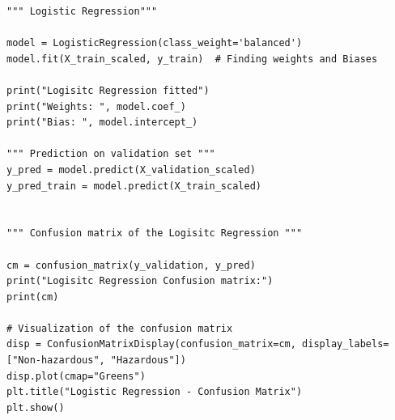 \documentclass{article}
\begin{document}
\begin{lstlisting}
""" Logistic Regression"""

model = LogisticRegression(class_weight='balanced')
model.fit(X_train_scaled, y_train)  # Finding weights and Biases

print("Logisitc Regression fitted")
print("Weights: ", model.coef_)
print("Bias: ", model.intercept_)

""" Prediction on validation set """
y_pred = model.predict(X_validation_scaled)
y_pred_train = model.predict(X_train_scaled)


""" Confusion matrix of the Logisitc Regression """

cm = confusion_matrix(y_validation, y_pred)
print("Logisitc Regression Confusion matrix:")
print(cm)

# Visualization of the confusion matrix
disp = ConfusionMatrixDisplay(confusion_matrix=cm, display_labels=["Non-hazardous", "Hazardous"])
disp.plot(cmap="Greens") 
plt.title("Logistic Regression - Confusion Matrix")
plt.show()

\end{lstlisting}
\end{document}
